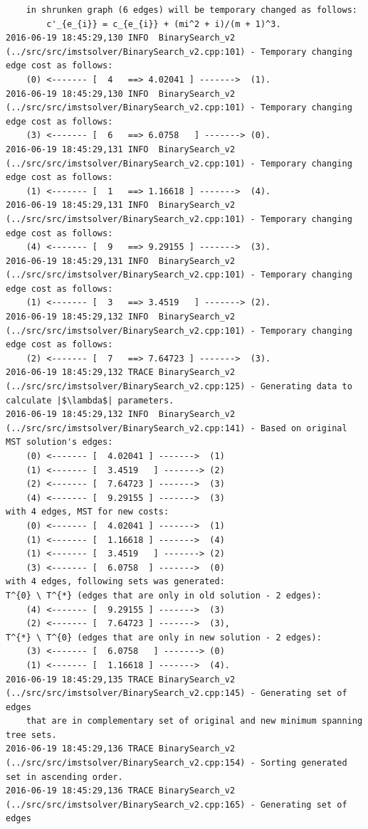\begin{verbatim}
	in shrunken graph (6 edges) will be temporary changed as follows:
		c'_{e_{i}} = c_{e_{i}} + (mi^2 + i)/(m + 1)^3.
2016-06-19 18:45:29,130 INFO  BinarySearch_v2 (../src/src/imstsolver/BinarySearch_v2.cpp:101) - Temporary changing edge cost as follows:
	(0)	<------- [	4	==>	4.02041	] ------->	(1).
2016-06-19 18:45:29,130 INFO  BinarySearch_v2 (../src/src/imstsolver/BinarySearch_v2.cpp:101) - Temporary changing edge cost as follows:
	(3)	<------- [	6	==>	6.0758	 ] ------->	(0).
2016-06-19 18:45:29,131 INFO  BinarySearch_v2 (../src/src/imstsolver/BinarySearch_v2.cpp:101) - Temporary changing edge cost as follows:
	(1)	<------- [	1	==>	1.16618	] ------->	(4).
2016-06-19 18:45:29,131 INFO  BinarySearch_v2 (../src/src/imstsolver/BinarySearch_v2.cpp:101) - Temporary changing edge cost as follows:
	(4)	<------- [	9	==>	9.29155	] ------->	(3).
2016-06-19 18:45:29,131 INFO  BinarySearch_v2 (../src/src/imstsolver/BinarySearch_v2.cpp:101) - Temporary changing edge cost as follows:
	(1)	<------- [	3	==>	3.4519	 ] ------->	(2).
2016-06-19 18:45:29,132 INFO  BinarySearch_v2 (../src/src/imstsolver/BinarySearch_v2.cpp:101) - Temporary changing edge cost as follows:
	(2)	<------- [	7	==>	7.64723	] ------->	(3).
2016-06-19 18:45:29,132 TRACE BinarySearch_v2 (../src/src/imstsolver/BinarySearch_v2.cpp:125) - Generating data to calculate |$\lambda$| parameters.
2016-06-19 18:45:29,132 INFO  BinarySearch_v2 (../src/src/imstsolver/BinarySearch_v2.cpp:141) - Based on original MST solution's edges:
	(0)	<------- [	4.02041	] ------->	(1)
	(1)	<------- [	3.4519	 ] ------->	(2)
	(2)	<------- [	7.64723	] ------->	(3)
	(4)	<------- [	9.29155	] ------->	(3)
with 4 edges, MST for new costs:
	(0)	<------- [	4.02041	] ------->	(1)
	(1)	<------- [	1.16618	] ------->	(4)
	(1)	<------- [	3.4519	 ] ------->	(2)
	(3)	<------- [	6.0758 	] ------->	(0)
with 4 edges, following sets was generated:
T^{0} \ T^{*} (edges that are only in old solution - 2 edges):
	(4)	<------- [	9.29155	] ------->	(3)
	(2)	<------- [	7.64723	] ------->	(3),
T^{*} \ T^{0} (edges that are only in new solution - 2 edges):
	(3)	<------- [	6.0758	 ] ------->	(0)
	(1)	<------- [	1.16618	] ------->	(4).
2016-06-19 18:45:29,135 TRACE BinarySearch_v2 (../src/src/imstsolver/BinarySearch_v2.cpp:145) - Generating set of edges 
	that are in complementary set of original and new minimum spanning tree sets.
2016-06-19 18:45:29,136 TRACE BinarySearch_v2 (../src/src/imstsolver/BinarySearch_v2.cpp:154) - Sorting generated set in ascending order.
2016-06-19 18:45:29,136 TRACE BinarySearch_v2 (../src/src/imstsolver/BinarySearch_v2.cpp:165) - Generating set of edges 

\end{verbatim}
